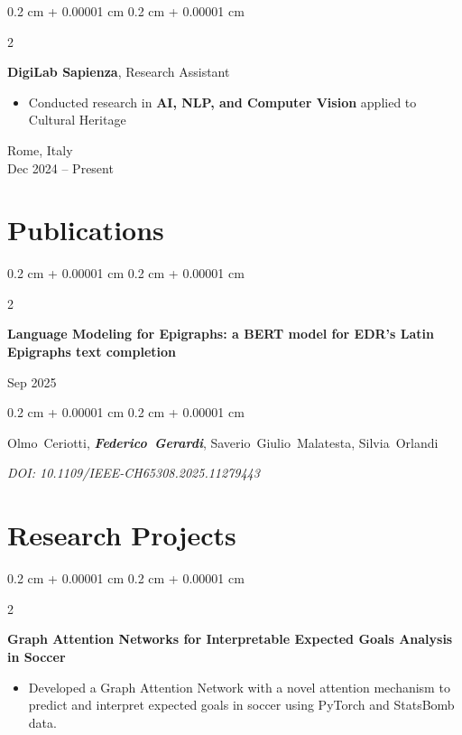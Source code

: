 \documentclass[10pt, letterpaper]{article}
\newenvironment{highlights}{
    \begin{itemize}[
        topsep=0.0 cm,
        parsep=0cm,
        partopsep=0pt,
        itemsep=0pt,
        leftmargin=0.15 cm + 10pt
    ]
}{
    \end{itemize}
} %
\newenvironment{onecolentry}{
    \begin{adjustwidth}{
        0.2 cm + 0.00001 cm
    }{
        0.2 cm + 0.00001 cm
    }
}{
    \end{adjustwidth}
} %
\newenvironment{twocolentry}[2][]{
    \onecolentry
    \def\secondColumn{#2}
    \setcolumnwidth{\fill, 4.5 cm}
    \begin{paracol}{2}
}{
    \switchcolumn \raggedleft \secondColumn
    \end{paracol}
    \endonecolentry
} %
\let\hrefWithoutArrow\href
\renewcommand{\href}[2]{\hrefWithoutArrow{#1}{\ifthenelse{\equal{#2}{}}{ }{#2 }\raisebox{.15ex}{\footnotesize \faExternalLink*}}}
\begin{document}
\begin{twocolentry}{
    Rome, Italy \\
    Dec 2024 – Present
}
    \textbf{DigiLab Sapienza}, Research Assistant
    \begin{highlights}
        \item Conducted research in \textbf{AI, NLP, and Computer Vision} applied to Cultural Heritage
    \end{highlights}
\end{twocolentry}

\section{Publications}
 
\begin{samepage}
    \begin{twocolentry}{
        Sep 2025
    }
        \textbf{Language Modeling for Epigraphs: a BERT model
for EDR’s Latin Epigraphs text completion}


        

    \end{twocolentry}
    \begin{onecolentry}
        
        \mbox{Olmo Ceriotti}, \mbox{\textbf{\textit{Federico Gerardi}}}, \mbox{Saverio Giulio Malatesta}, \mbox{Silvia Orlandi} 
        
        \textit{DOI: 10.1109/IEEE-CH65308.2025.11279443}
    \end{onecolentry}
\end{samepage}

\section{Research Projects}

\begin{twocolentry}{2025}
\textbf{Graph Attention Networks for Interpretable Expected Goals Analysis in Soccer}

\end{twocolentry}
\begin{highlights}
\item Developed a Graph Attention Network with a novel attention mechanism to predict and interpret expected goals in soccer using PyTorch and StatsBomb data.
\end{highlights}
\end{document}
